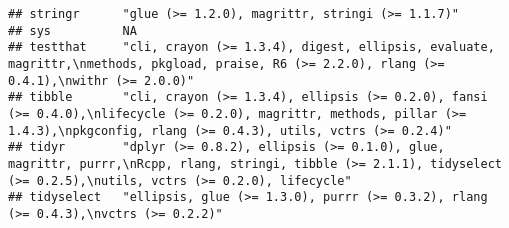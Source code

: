 \documentclass[]{book}
\begin{document}
\begin{verbatim}
## stringr      "glue (>= 1.2.0), magrittr, stringi (>= 1.1.7)"                                                                                                                                                                                                                                                                                                                                                                                                                                                             
## sys          NA                                                                                                                                                                                                                                                                                                                                                                                                                                                                                                          
## testthat     "cli, crayon (>= 1.3.4), digest, ellipsis, evaluate, magrittr,\nmethods, pkgload, praise, R6 (>= 2.2.0), rlang (>= 0.4.1),\nwithr (>= 2.0.0)"                                                                                                                                                                                                                                                                                                                                                               
## tibble       "cli, crayon (>= 1.3.4), ellipsis (>= 0.2.0), fansi (>= 0.4.0),\nlifecycle (>= 0.2.0), magrittr, methods, pillar (>= 1.4.3),\npkgconfig, rlang (>= 0.4.3), utils, vctrs (>= 0.2.4)"                                                                                                                                                                                                                                                                                                                         
## tidyr        "dplyr (>= 0.8.2), ellipsis (>= 0.1.0), glue, magrittr, purrr,\nRcpp, rlang, stringi, tibble (>= 2.1.1), tidyselect (>= 0.2.5),\nutils, vctrs (>= 0.2.0), lifecycle"                                                                                                                                                                                                                                                                                                                                        
## tidyselect   "ellipsis, glue (>= 1.3.0), purrr (>= 0.3.2), rlang (>= 0.4.3),\nvctrs (>= 0.2.2)"                                                                                                                                                                                                                                                                                                                                                                                                                          

\end{verbatim}
\end{document}
